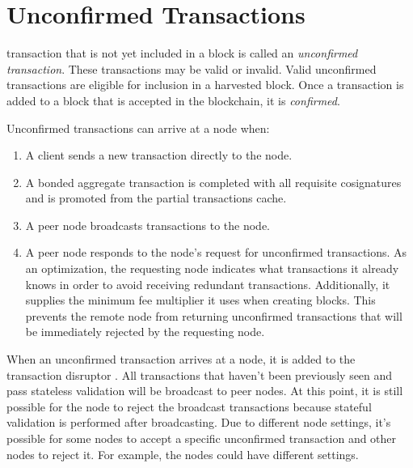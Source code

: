 \section{Unconfirmed Transactions}
\label{sec:unconfirmedTransactions}


 transaction that is not yet included in a block is called an \textit{unconfirmed transaction}.
These transactions may be valid or invalid.
Valid unconfirmed transactions are eligible for inclusion in a harvested block.
Once a transaction is added to a block that is accepted in the blockchain, it is \textit{confirmed}.

Unconfirmed transactions can arrive at a node when:
\begin{enumerate}
	\item{A client sends a new transaction directly to the node.}
	\item{A bonded aggregate transaction is completed with all requisite cosignatures and is promoted from the partial transactions cache.}
	\item{A peer node broadcasts transactions to the node.}
	\item{A peer node responds to the node's request for unconfirmed transactions.
	As an optimization, the requesting node indicates what transactions it already knows in order to avoid receiving redundant transactions.
	Additionally, it supplies the minimum fee multiplier  it uses when creating blocks.
	This prevents the remote node from returning unconfirmed transactions that will be immediately rejected by the requesting node.}
\end{enumerate}

When an unconfirmed transaction arrives at a node, it is added to the transaction disruptor .
All transactions that haven't been previously seen and pass stateless validation will be broadcast to peer nodes.
At this point, it is still possible for the node to reject the broadcast transactions because stateful validation is performed after broadcasting.
Due to different node settings, it's possible for some nodes to accept a specific unconfirmed transaction and other nodes to reject it.
For example, the nodes could have different  settings.

